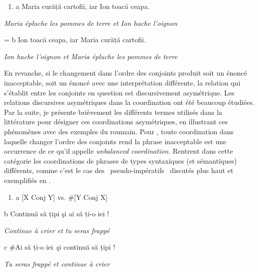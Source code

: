 \begin{enumerate}
\item \label{bkm:Ref300784197}a  Maria curăță cartofii, iar Ion toacă ceapa.


\end{enumerate}
{\itshape
Maria épluche les pommes de terre et Ion hache l'oignon}

=  b  Ion toacă ceapa, iar Maria curăță cartofii. 

{\itshape
Ion hache l'oignon et Maria épluche les pommes de terre}

En revanche, si le changement dans l'ordre des conjoints produit soit un énoncé inacceptable, soit un énoncé avec une interprétation différente, la relation qui s'établit entre les conjoints en question est discursivement asymétrique. Les relations discursives asymétriques dans la coordination ont été beaucoup étudiées. Par la suite, je présente brièvement les différents termes utilisés dans la littérature pour désigner ces coordinations asymétriques, en illustrant ces phénomènes avec des exemples du roumain. Pour \citet{Johannessen1998}, toute coordination dans laquelle changer l'ordre des conjoints rend la phrase inacceptable est une occurrence de ce qu'il appelle \textit{unbalanced coordination}. Rentrent dans cette catégorie les coordinations de phrases de types syntaxiques (et sémantiques) différents, comme c'est le cas des {\guillemotleft}~pseudo-impératifs~{\guillemotright} discutés plus haut et exemplifiés en .  


\begin{enumerate}
\item \label{bkm:Ref300784757}a  [X Conj Y] vs. \#[Y Conj X]  


\end{enumerate}
  b  Continuă să țipi şi ai să ți-o iei ! 

{\itshape
Continue à crier et tu seras frappé}

  c  \#Ai să ți-o iei~şi continuă să țipi !

  \textit{Tu seras frappé et continue à crier}

